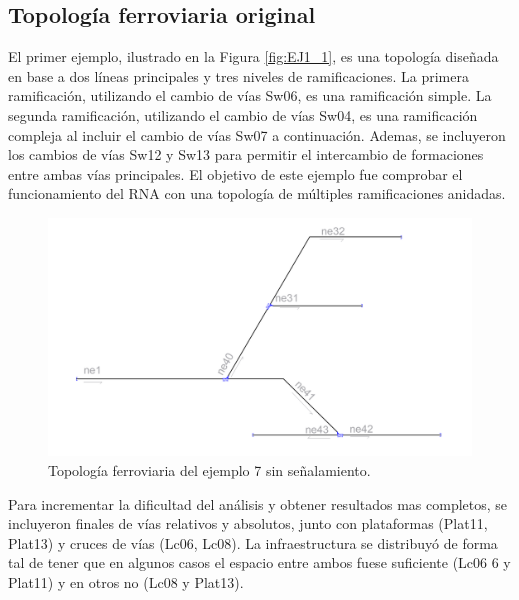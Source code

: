 \subsection{Topología ferroviaria original}

	El primer ejemplo, ilustrado en la Figura \ref{fig:EJ1_1}, es una topología diseñada en base a dos líneas principales y tres niveles de ramificaciones. La primera ramificación, utilizando el cambio de vías Sw06, es una ramificación simple. La segunda ramificación, utilizando el cambio de vías Sw04, es una ramificación compleja al incluir el cambio de vías Sw07 a continuación. Ademas, se incluyeron los cambios de vías Sw12 y Sw13 para permitir el intercambio de formaciones entre ambas vías principales. El objetivo de este ejemplo fue comprobar el funcionamiento del RNA con una topología de múltiples ramificaciones anidadas.	
	
	\begin{figure}[h]
		\centering
		\includegraphics[width=1\textwidth]{resultados-obtenidos/ejemplo7/images/7_empty.png}
		\centering\caption{Topología ferroviaria del ejemplo 7 sin señalamiento.}
		\label{fig:EJ7_1}
	\end{figure}
	
	Para incrementar la dificultad del análisis y obtener resultados mas completos, se incluyeron finales de vías relativos y absolutos, junto con plataformas (Plat11, Plat13) y cruces de vías (Lc06, Lc08). La infraestructura se distribuyó de forma tal de tener que en algunos casos el espacio entre ambos fuese suficiente (Lc06 6 y Plat11) y en otros no (Lc08 y Plat13).